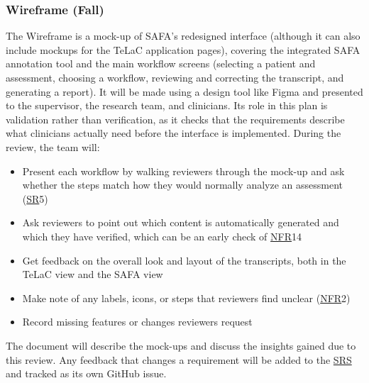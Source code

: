 \documentclass[12pt, titlepage]{article}
\newcommand{\SRSLink}{\href{https://github.com/Nour-Fawaz/MacaBoca/blob/main/pdfs/SRS/SRS.pdf}{SRS}}
\newcommand{\srsnfr}[1]{\href{https://github.com/Nour-Fawaz/MacaBoca/blob/main/pdfs/SRS/SRS.pdf}{NFR}}
\newcommand{\srssr}[1]{\href{https://github.com/Nour-Fawaz/MacaBoca/blob/main/pdfs/SRS/SRS.pdf}{SR}}
\renewcommand{\_}{\oldunderscore\allowbreak}
\begin{document}
\subsubsection{Wireframe (Fall)}
The Wireframe is a mock-up of SAFA's redesigned interface (although it can also include mockups for the TeLaC application pages), covering the integrated SAFA annotation tool and the main workflow screens (selecting a patient and assessment, choosing a workflow, reviewing and correcting the transcript, and generating a report).
It will be made using a design tool like Figma and presented to the supervisor, the research team, and clinicians.
Its role in this plan is validation rather than verification, as it checks that the requirements describe what clinicians actually need before the interface is implemented.
During the review, the team will:
\begin{itemize}
  \item Present each workflow by walking reviewers through the mock-up and ask whether the steps match how they would normally analyze an assessment (\srssr*{5})
  \item Ask reviewers to point out which content is automatically generated and which they have verified, which can be an early check of \srsnfr*{14}
  \item Get feedback on the overall look and layout of the transcripts, both in the TeLaC view and the SAFA view
  \item Make note of any labels, icons, or steps that reviewers find unclear (\srsnfr*{2})
  \item Record missing features or changes reviewers request
\end{itemize}
The document will describe the mock-ups and discuss the insights gained due to this review.
Any feedback that changes a requirement will be added to the \SRSLink{} and tracked as its own GitHub issue.
\end{document}
